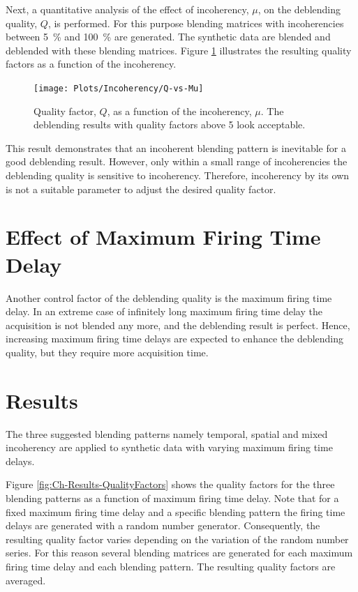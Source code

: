 Next, a quantitative analysis of the effect of incoherency, $\mu$, on the deblending quality, $Q$, is performed. For this purpose blending matrices with incoherencies between \SI{5}{\percent} and \SI{100}{\percent} are generated. The synthetic data are blended and deblended with these blending matrices. Figure \ref{fig:Ch-Results-QvsMu} illustrates the resulting quality factors as a function of the incoherency. 

\begin{figure}
	\centering
	\texttt{[image: Plots/Incoherency/Q-vs-Mu]}
	\caption{Quality factor, $Q$, as a function of the incoherency, $\mu$. The deblending results with quality factors above 5 look acceptable.}
	\label{fig:Ch-Results-QvsMu}
\end{figure}

This result demonstrates that an incoherent blending pattern is inevitable for a good deblending result. However, only within a small range of incoherencies the deblending quality is sensitive to incoherency. Therefore, incoherency by its own is not a suitable parameter to adjust the desired quality factor.


\section{Effect of Maximum Firing Time Delay}

Another control factor of the deblending quality is the maximum firing time delay. In an extreme case of infinitely long maximum firing time delay the acquisition is not blended any more, and the deblending result is perfect. Hence, increasing maximum firing time delays are expected to enhance the deblending quality, but they require more acquisition time.



\section{Results}

The three suggested blending patterns namely temporal, spatial and mixed incoherency are applied to synthetic data with varying maximum firing time delays. 

Figure \ref{fig:Ch-Results-QualityFactors} shows the quality factors for the three blending patterns as a function of maximum firing time delay. Note that for a fixed maximum firing time delay and a specific blending pattern the firing time delays are generated with a random number generator. Consequently, the resulting quality factor varies depending on the variation of the random number series. For this reason several blending matrices are generated for each maximum firing time delay and each blending pattern. The resulting quality factors are averaged.


